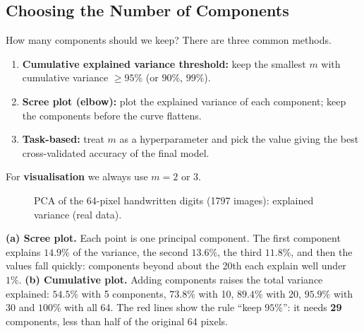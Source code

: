 \subsection{Choosing the Number of Components}

How many components should we keep? There are three common methods.

\begin{enumerate}
  \item \textbf{Cumulative explained variance threshold:} keep the smallest $m$ with cumulative variance $\ge95\%$ (or $90\%$, $99\%$).
  \item \textbf{Scree plot (elbow):} plot the explained variance of each component; keep the components before the curve flattens.
  \item \textbf{Task-based:} treat $m$ as a hyperparameter and pick the value giving the best cross-validated accuracy of the final model.
\end{enumerate}

For \textbf{visualisation} we always use $m=2$ or $3$.

\begin{figure}[!htbp]
\centering
{}
\caption{PCA of the 64-pixel handwritten digits (1797 images): explained variance (real data).}\label{fig:digitscree}
\end{figure}

\begin{explain}
\textbf{(a) Scree plot.} Each point is one principal component. The first component explains $14.9\%$ of the variance, the second $13.6\%$, the third $11.8\%$, and then the values fall quickly: components beyond about the 20th each explain well under $1\%$. \textbf{(b) Cumulative plot.} Adding components raises the total variance explained: $54.5\%$ with 5 components, $73.8\%$ with 10, $89.4\%$ with 20, $95.9\%$ with 30 and $100\%$ with all 64. The red lines show the rule ``keep $95\%$'': it needs \textbf{29} components, less than half of the original 64 pixels.
\end{explain}

